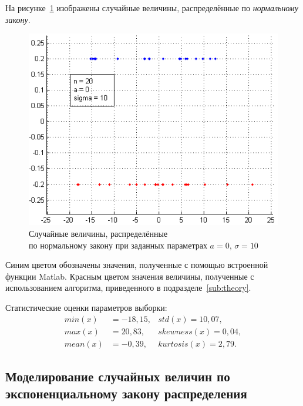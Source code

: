 На рисунке~\ref{pic:normal} изображены случайные величины, распределённые
по \textit{нормальному закону}.
\begin{figure}[h!]
  \centering
  \includegraphics[width=0.9\linewidth]{pic/normal}
  \caption{Случайные величины, распределённые \\ по нормальному закону при заданных параметрах $ a = 0 $, $ \sigma = 10 $}
  \label{pic:normal}
\end{figure}

Синим цветом обозначены значения, полученные с помощью
встроенной функции Matlab. Красным цветом значения величины, полученные
с использованием алгоритма, приведенного в подразделе~\ref{sub:theory}.

Статистические оценки параметров выборки:
\begin{align*}
  min (x)  &= -18,15, & std (x) = 10,07, \\
  max (x)  &= 20,83,  & skewness (x) = 0,04, \\
  mean (x) &= -0,39,  & kurtosis (x) = 2,79.
\end{align*}

\newpage

\subsection{Моделирование случайных величин по экспоненциальному закону распределения}

